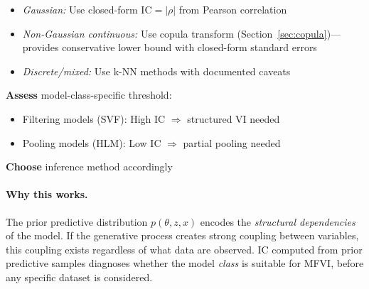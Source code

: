 \documentclass[10pt]{article} %
\theoremstyle{plain}
\theoremstyle{definition}
\newcommand{\IC}{\mathrm{IC}}  %
\begin{document}
\begin{algorithm}[!htbp]
\begin{algorithmic}[1]
\begin{itemize}
    \item \textit{Gaussian:} Use closed-form $\IC = |\rho|$ from Pearson correlation
    \item \textit{Non-Gaussian continuous:} Use copula transform (Section~\ref{sec:copula})---provides conservative lower bound with closed-form standard errors
    \item \textit{Discrete/mixed:} Use k-NN methods with documented caveats \citep{vandenberg2025linfoot}
\end{itemize}
\State \textbf{Assess} model-class-specific threshold:
\begin{itemize}
    \item Filtering models (SVF): High IC $\Rightarrow$ structured VI needed
    \item Pooling models (HLM): Low IC $\Rightarrow$ partial pooling needed
\end{itemize}
\State \textbf{Choose} inference method accordingly
\end{algorithmic}
\end{algorithm}

\paragraph{Why this works.} The prior predictive distribution $p(\theta, z, x)$ encodes the \emph{structural dependencies} of the model. If the generative process creates strong coupling between variables, this coupling exists regardless of what data are observed. IC computed from prior predictive samples diagnoses whether the model \emph{class} is suitable for MFVI, before any specific dataset is considered.
\end{document}

